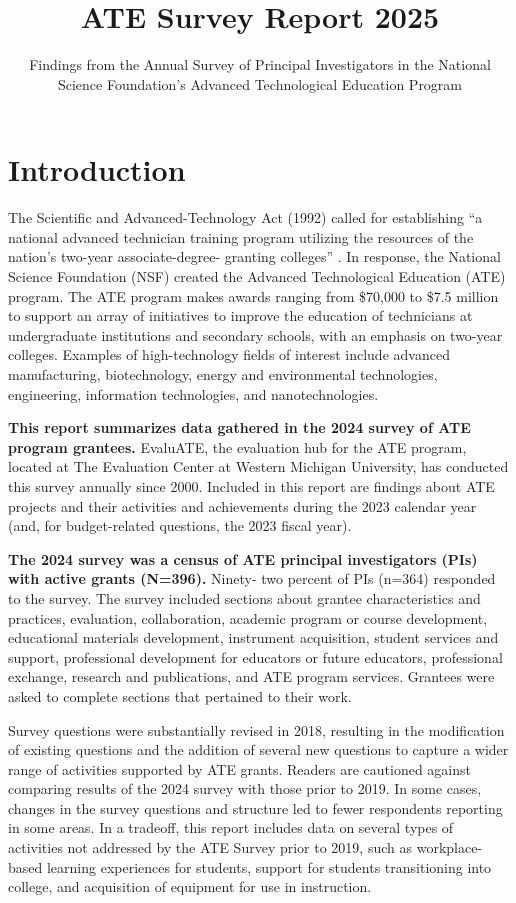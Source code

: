 \documentclass[
]{report}
\title{ATE Survey Report 2025}
\subtitle{Findings from the Annual Survey of Principal Investigators in the National Science Foundation's Advanced Technological Education Program}
\author{}
\date{\vspace{-2.5em}}
\begin{document}
\maketitle

{
\setcounter{tocdepth}{1}
\tableofcontents
}
\hypertarget{introduction}{%
\chapter*{Introduction}\label{introduction}}

The Scientific and Advanced-Technology Act (1992) called for establishing ``a national advanced technician training program utilizing the resources of the nation's two-year associate-degree- granting colleges'' \autocite{scientific1992act}. In response, the National Science Foundation (NSF) created the Advanced Technological Education (ATE) program. The ATE program makes awards ranging from \$70,000 to \$7.5 million to support an array of initiatives to improve the education of technicians at undergraduate institutions and secondary schools, with an emphasis on two-year colleges. Examples of high-technology fields of interest include advanced manufacturing, biotechnology, energy and environmental technologies, engineering, information technologies, and nanotechnologies.

\textcolor{327492}{\textbf{This report summarizes data gathered in the 2024 survey of ATE program grantees.}} EvaluATE, the evaluation hub for the ATE program, located at The Evaluation Center at Western Michigan University, has conducted this survey annually since 2000. Included in this report are findings about ATE projects and their activities and achievements during the 2023 calendar year (and, for budget-related questions, the 2023 fiscal year).

\textcolor{327492}{\textbf{The 2024 survey was a census of ATE principal investigators (PIs) with active grants (N=396).}} Ninety- two percent of PIs (n=364) responded to the survey. The survey included sections about grantee characteristics and practices, evaluation, collaboration, academic program or course development, educational materials development, instrument acquisition, student services and support, professional development for educators or future educators, professional
exchange, research and publications, and ATE program services. Grantees were asked to complete sections that pertained to their work.

Survey questions were substantially revised in 2018, resulting in the modification of existing questions and the addition of several new questions to capture a wider range of activities supported by ATE grants. Readers are cautioned against comparing results of the 2024 survey with those prior to 2019. In some cases, changes in the survey questions and structure led to fewer respondents reporting in some areas. In a tradeoff, this report includes data on several types of activities not addressed by the ATE Survey prior to 2019, such as workplace-based learning experiences for students, support for students transitioning into college, and acquisition of equipment for use in instruction.
\end{document}
